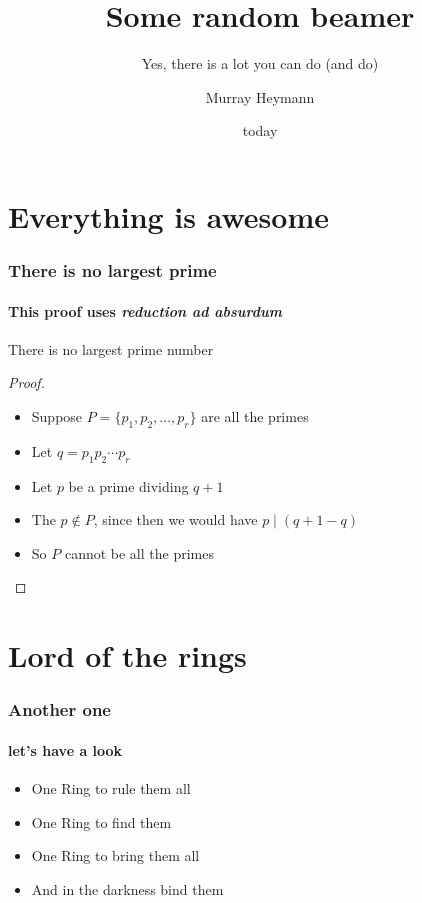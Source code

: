 \documentclass{beamer}
\title{Some random beamer}
\subtitle{Yes, there is a lot you can do (and do)}
\author{Murray Heymann}
\institute{University of Stellenbosch}
\date{today}
\begin{document}
\begin{frame}
	\titlepage
\end{frame}

\section{Everything is awesome}

\begin{frame}
	\frametitle{There is no largest prime}
	\framesubtitle{This proof uses \emph{reduction ad absurdum}}

	\begin{theorem}
		There is no largest prime number
	\end{theorem}


	\begin{proof}
		\begin{itemize}
			\item<1->
				Suppose $P = \{p_{1}, p_{2}, \dotsc, p_{r}\}$ are all the
				primes
			\item<2-3>
				Let $q = p_{1} p_{2} \dotsb p_{r}$
			\item<3> Let $p$ be a prime dividing $q+1$
			\item<4-> The $p \not \in P$, since then we would have $p \mid (q + 1 - q)$
			\item<1-> So $P$ cannot be all the primes
		\end{itemize}
	\end{proof}
\end{frame}

\section{Lord of the rings}

\begin{frame}
	\frametitle{Another one}
	\framesubtitle{let's have a look}


	\begin{itemize}
		\item
			One Ring to rule them all
		\item
			One Ring to find them
		\item
			One Ring to bring them all
		\item
			And in the darkness bind them
	\end{itemize}
\end{frame}
\end{document}
